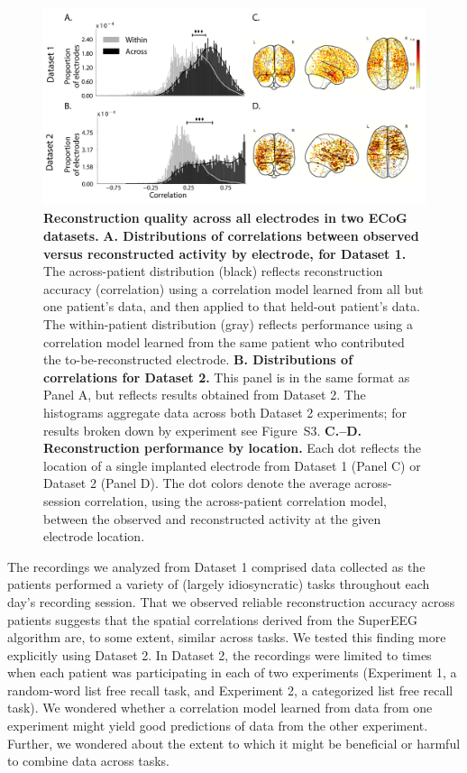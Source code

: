 \message{ !name(main.tex)}\documentclass[11pt]{article}
\newcommand{\perexptaskreconseparated}{S3}
\begin{document}
{%
\begin{figure}
  \centering
  \includegraphics[width=\textwidth]{figs/corrmap}
  \caption{\textbf{Reconstruction quality across all electrodes in two
      ECoG datasets.}  \textbf{A. Distributions of correlations
      between observed versus reconstructed activity by electrode, for
      Dataset 1.}  The across-patient distribution (black) reflects
    reconstruction accuracy (correlation) using a correlation model
    learned from all but one patient's data, and then applied to that
    held-out patient's data.  The within-patient distribution (gray)
    reflects performance using a correlation model learned from the same
    patient who contributed the to-be-reconstructed electrode.
    \textbf{B. Distributions of correlations for Dataset 2.}  This
    panel is in the same format as Panel A, but reflects results
    obtained from Dataset 2.  The histograms aggregate data across
    both Dataset 2 experiments; for results broken down by experiment
    see Figure~\perexptaskreconseparated. \textbf{C.--D.  Reconstruction
      performance by location.} Each dot reflects the location of a
    single implanted electrode from Dataset 1 (Panel C) or Dataset 2
    (Panel D).  The dot colors denote the average across-session
    correlation, using the across-patient correlation model, between
    the observed and reconstructed activity at the given electrode
    location.}
  \label{fig:corrmap}
\end{figure}

The recordings we analyzed from Dataset 1 comprised data collected as
the patients performed a variety of (largely idiosyncratic) tasks
throughout each day's recording session.  That we observed reliable
reconstruction accuracy across patients suggests that the spatial
correlations derived from the SuperEEG algorithm are, to some extent,
similar across tasks.  We tested this finding more explicitly using
Dataset 2.  In Dataset 2, the recordings were limited to times when
each patient was participating in each of two experiments (Experiment
1, a random-word list free recall task, and Experiment 2, a
categorized list free recall task).  We wondered whether a correlation
model learned from data from one experiment might yield good
predictions of data from the other experiment.  Further, we wondered
about the extent to which it might be beneficial or harmful to combine
data across tasks.

}
\end{document}
